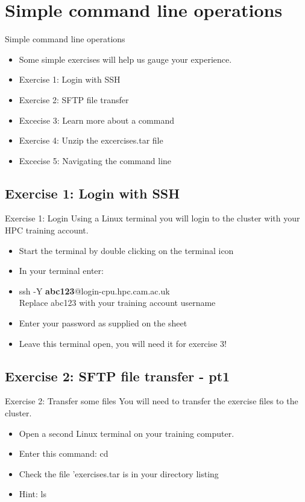 \section{Simple command line operations}
\begin{frame}{Simple command line operations}
\begin{itemize}
\item{Some simple exercises will help us gauge your experience.}
\item{Exercise 1: Login with SSH}
\item{Exercise 2: SFTP file transfer}
\item{Excecise 3: Learn more about a command}
\item{Exercise 4: Unzip the excercises.tar file}
\item{Excecise 5: Navigating the command line}
\end{itemize}
\end{frame}

\subsection{Exercise 1: Login with SSH}
\begin{frame}{Exercise 1: Login}
Using a Linux terminal you will login to the cluster with your HPC training account.
\begin{itemize}
\item{Start the terminal by double clicking on the terminal icon}
\item In your terminal enter:
\item{ssh -Y \textbf{abc123}@login-cpu.hpc.cam.ac.uk}\\
Replace abc123 with your training account username 
\item {Enter your password as supplied on the sheet}
\item{Leave this terminal open, you will need it for exercise 3!}
\end{itemize}
\end{frame}

\subsection{Exercise 2: SFTP file transfer - pt1}
\begin{frame}{Exercise 2: Transfer some files}
You will need to transfer the exercise files to the cluster.
\begin{itemize}
\item{Open a second Linux terminal on your training computer.}
\item{Enter this command: cd \alert{\footnotesize {}}}
\item{Check the file 'exercises.tar is in your directory listing}
\item{Hint: ls}
\end{itemize}
\end{frame}

